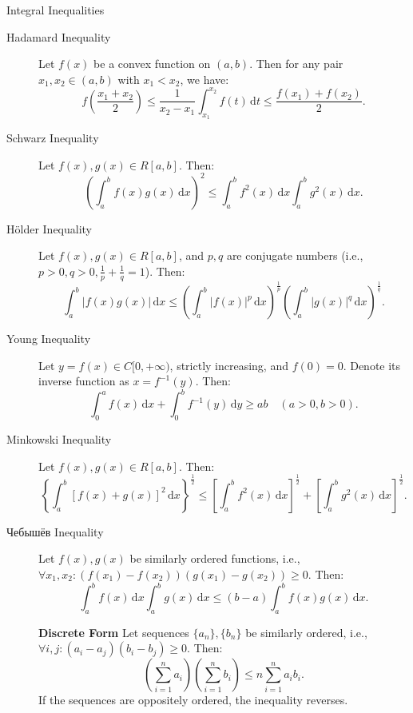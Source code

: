 \documentclass[11pt]{../../TexTemplate/elegantbook}
\begin{document}
\begin{theorem}{Integral Inequalities}
    \begin{description}
        \item[Hadamard Inequality] Let \( f(x) \) be a convex function on \( (a, b) \). 
            Then for any pair \( x_1, x_2 \in (a, b) \) with \( x_1 < x_2 \), we have:
            \[
            f\left( \frac{x_1 + x_2}{2} \right) \leqslant \frac{1}{x_2 - x_1} \int_{x_1}^{x_2} f(t) \, \mathrm{d}t \leqslant \frac{f(x_1) + f(x_2)}{2}.
            \]

        \item[Schwarz Inequality] Let \( f(x), g(x) \in R[a, b] \). Then:
            \[
            \left( \int_{a}^{b} f(x)g(x) \, \mathrm{d}x \right)^2 \leqslant \int_{a}^{b} f^2(x) \, \mathrm{d}x \int_{a}^{b} g^2(x) \, \mathrm{d}x.
            \]

        \item[Hölder Inequality] Let \( f(x), g(x) \in R[a, b] \), and \( p, q \) are conjugate numbers 
            (i.e., \( p > 0, q > 0, \frac{1}{p} + \frac{1}{q} = 1 \)). Then:
            \[
            \int_{a}^{b} |f(x)g(x)| \, \mathrm{d}x \leqslant \left( \int_{a}^{b} |f(x)|^p \, \mathrm{d}x \right)^{\frac{1}{p}} \left( \int_{a}^{b} |g(x)|^q \, \mathrm{d}x \right)^{\frac{1}{q}}.
            \]

        \item[Young Inequality] Let \( y = f(x) \in C[0, +\infty) \), strictly increasing, 
            and \( f(0) = 0 \). Denote its inverse function as \( x = f^{-1}(y) \). Then:
            \[
            \int_{0}^{a} f(x) \, \mathrm{d}x + \int_{0}^{b} f^{-1}(y) \, \mathrm{d}y \geqslant ab \quad (a > 0, b > 0).
            \]

        \item[Minkowski Inequality] Let \( f(x), g(x) \in R[a, b] \). Then:
            \[
            \left\{ \int_{a}^{b} [f(x) + g(x)]^2 \, \mathrm{d}x \right\}^{\frac{1}{2}} \leqslant \left[ \int_{a}^{b} f^2(x) \, \mathrm{d}x \right]^{\frac{1}{2}} + \left[ \int_{a}^{b} g^2(x) \, \mathrm{d}x \right]^{\frac{1}{2}}.
            \]

        \item[Чебышёв Inequality] Let \( f(x), g(x) \) be similarly ordered functions, 
                i.e., \( \forall x_1, x_2: (f(x_1) - f(x_2))(g(x_1) - g(x_2)) \geqslant 0 \). Then:
                \[
                \int_{a}^{b} f(x) \, \mathrm{d}x \int_{a}^{b} g(x) \, \mathrm{d}x \leqslant (b - a) \int_{a}^{b} f(x)g(x) \, \mathrm{d}x.
                \]

            \textbf{Discrete Form} Let sequences \( \{a_n\}, \{b_n\} \) be similarly ordered, 
                i.e., \( \forall i, j: (a_i - a_j)(b_i - b_j) \geqslant 0 \). Then:
                \[
                \left( \sum\limits_{i=1}^{n} a_i \right) \left( \sum\limits_{i=1}^{n} b_i \right) \leqslant n \sum\limits_{i=1}^{n} a_i b_i.
                \]
            If the sequences are oppositely ordered, the inequality reverses.
    \end{description}
\end{theorem}
\end{document}
